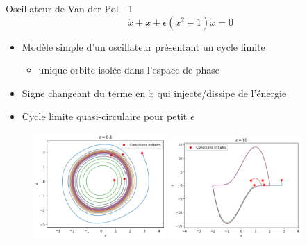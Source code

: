 \begin{frame}{Oscillateur de Van der Pol - 1}
    $$ \ddot{x}  +  x + \epsilon(x^2 - 1)\dot{x} = 0 $$
    \begin{itemize}
        \item Modèle simple d'un oscillateur présentant un cycle limite
        \begin{itemize}
            \item unique orbite isolée dans l'espace de phase
        \end{itemize}
        \item Signe changeant du terme en $\dot{x}$ qui injecte/dissipe de l'énergie
        \item Cycle limite quasi-circulaire pour petit $\epsilon$
    \end{itemize}

    \begin{figure}
        \includegraphics[width=0.45\textwidth]{images/vdp/vanderpol_small.png}
        \includegraphics[width=0.45\textwidth]{images/vdp/vanderpol_large.png}
    \end{figure}

\end{frame}

